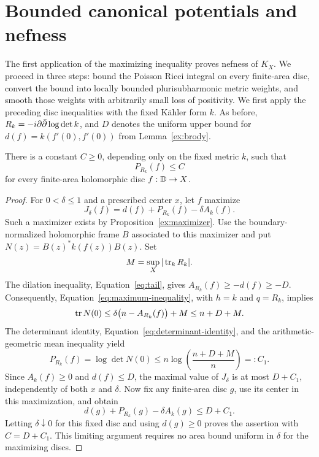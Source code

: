 \section{Bounded canonical potentials and nefness}
\label{sec:nefness}

The first application of the maximizing inequality proves nefness of
$K_X$. We proceed in three steps: bound the Poisson Ricci integral on
every finite-area disc,
convert the bound into locally bounded plurisubharmonic metric weights,
and smooth those weights with arbitrarily small loss of positivity.
We first apply the preceding disc inequalities with the fixed K\"ahler
form $k$.  As before, $R_k=-i\partial\bar\partial\log\det k$, and $D$ denotes the
uniform upper bound for $d(f)=k(f'(0),f'(0))$ from
Lemma~\ref{ex:brody}.

\begin{proposition}
\label{nef:disc-bound}
There is a constant $C\geq 0$, depending only on the fixed metric $k$,
such that
\begin{equation}
 P_{R_k}(f)\leq C
 \label{eq:nef-uniform-disc-bound}
\end{equation}
for every finite-area holomorphic disc $f:\mathbb D\to X$.
\end{proposition}

\begin{proof}
For $0<\delta\leq 1$ and a prescribed center $x$, let $f$ maximize
\[
J_\delta(f)=d(f)+P_{R_k}(f)-\delta A_k(f).
\]
Such a maximizer exists by Proposition~\ref{ex:maximizer}.
Use the boundary-normalized holomorphic frame $B$ associated to this
maximizer and put $N(z)=B(z)^*k(f(z))B(z)$.  Set
\[
 M=\sup_X|\operatorname{tr}_k R_k|.
\]
The dilation inequality, Equation~\eqref{eq:tail}, gives
$A_{R_k}(f)\geq-d(f)\geq-D$.
Consequently, Equation~\eqref{eq:maximum-inequality}, with $h=k$ and
$q=R_k$, implies
\[
 \operatorname{tr} N(0)
 \leq \delta\bigl(n-A_{R_k}(f)\bigr)+M
 \leq n+D+M.
\]
The determinant identity, Equation~\eqref{eq:determinant-identity},
and the arithmetic-geometric mean inequality yield
\[
 P_{R_k}(f)=\log\det N(0)
 \leq n\log\!\left(\frac{n+D+M}{n}\right)=:C_1.
\]
Since $A_k(f)\geq0$ and $d(f)\leq D$, the maximal value of
$J_\delta$ is at most $D+C_1$, independently of both $x$ and $\delta$.
Now fix any finite-area disc $g$, use its center in this maximization,
and obtain
\[
 d(g)+P_{R_k}(g)-\delta A_k(g)\leq D+C_1.
\]
Letting $\delta\downarrow0$ for this fixed disc and using $d(g)\geq0$
proves the assertion with $C=D+C_1$.  This limiting argument requires
no area bound uniform in $\delta$ for the maximizing discs.
\end{proof}

